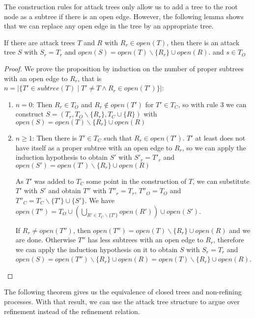 The construction rules for attack trees only allow us to add a tree
to the root node as a subtree if there is an open edge.
However, the following lemma shows that we can replace any open edge
in the tree by an appropriate tree.

\begin{lemma}
  \label{lemma:tree-composition}
  If there are attack trees $T$ and $R$ with
  $R_r ∈ open(T)$,
  then there is an attack tree $S$ with
  $S_r = T_r$ and
  $open(S) = open(T) ∖ \{R_r\} ∪ open(R)$.
  and $s ∈ T_O$
\end{lemma}
\begin{proof}
  We prove the proposition by induction on the number of proper subtrees
  with an open edge to $R_r$, that is
  $n = |\{ T' ∈ subtree(T) \mid T' ≠ T ∧ R_r ∈ open(T')\}|$:
  \begin{enumerate}
    \item $n = 0$:
      Then $R_r ∈ T_O$ and $R_r ∉ open(T')$ for $T' ∈ T_C$,
      so with rule 3 we can construct
      $S = (T_r, T_O ∖ \{R_r\}, T_C ∪ \{R\})$ with
      $open(S) = open(T) ∖ \{R_r\} ∪ open(R)$
    \item $n ≥ 1$:
      Then there is $T' ∈ T_C$ such that $R_r ∈ open(T')$.
      $T'$ at least does not have itself as a proper subtree
      with an open edge to $R_r$, so we can apply
      the induction hypothesis to obtain
      $S'$ with $S'_r = T'_r$ and
      $open(S') = open(T') ∖ \{R_r\} ∪ open(R)$

      As $T'$ was added to $T_C$ some point in the construction of $T$,
      we can substitute $T'$ with $S'$ and obtain
      $T''$ with $T''_r = T_r$, $T''_O = T_O$ and
      $T''_C = T_C ∖ \{T'\} ∪ \{S'\}$.
      We have $open(T'') = T_O ∪ \left(⋃_{R' ∈ T_C ∖ \{T'\} } open(R')\right) ∪ open(S')$.

      If $R_r ≠ open(T'')$, then $open(T'') = open(T) ∖ \{R_r\} ∪ open(R)$ and we are done.
      Otherwise $T''$ has less subtrees with an open edge to
      $R_r$, therefore we
      can apply the induction hypothesis on it to obtain
      $S$ with $S_r = T_r$ and
      $open(S) = open(T'') ∖ \{R_r\} ∪ open(R) = open(T) ∖ \{R_r\} ∪ open(R)$.
  \end{enumerate}
\end{proof}

The following theorem gives us the equivalence of closed trees
and non-refining processes. With that result, we can
use the attack tree structure to argue over refinement instead
of the refinement relation.

